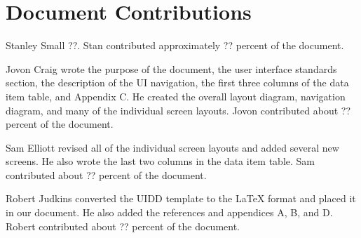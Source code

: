 \documentclass{article}
\begin{document}
\newpage
\section{Document Contributions}

Stanley Small ??. Stan contributed approximately ?? percent of the document.

Jovon Craig wrote the purpose of the document, the user interface standards section, the description of the UI navigation, the first three columns of the data item table, and Appendix C. He created the overall layout diagram, navigation diagram, and many of the individual screen layouts. Jovon contributed about ?? percent of the document.

Sam Elliott revised all of the individual screen layouts and added several new screens. He also wrote the last two columns in the data item table. Sam contributed about ?? percent of the document.

Robert Judkins converted the UIDD template to the LaTeX format and placed it in our document. He also added the references and appendices A, B, and D. Robert contributed about ?? percent of the document.

\newpage



\end{document}
